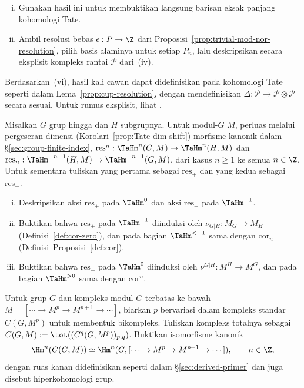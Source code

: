 \begin{Exercises}
\begin{enumerate}[(i)]
		\item Gunakan hasil ini untuk membuktikan langsung barisan eksak panjang
		kohomologi Tate.
		\item Ambil resolusi bebas $\epsilon:P\to\Z$ dari
		Proposisi~\ref{prop:trivial-mod-nor-resolution}, pilih basis alaminya
		untuk setiap $P_n$, lalu deskripsikan secara eksplisit kompleks rantai
		$\mathcal{P}$ dari~(iv).
	\end{enumerate}

	Berdasarkan~(vi), hasil kali cawan dapat didefinisikan pada kohomologi
	Tate seperti dalam Lema~\ref{prop:cup-resolution}, dengan mendefinisikan
	$\Delta:\mathcal{P}\to\mathcal{P}\otimes\mathcal{P}$ secara sesuai.
	Untuk rumus eksplisit, lihat \cite[Bab IV, \S 7]{CF67}.

	\item Misalkan $G$ grup hingga dan $H$ subgrupnya. Untuk modul-$G$ $M$,
	perluas melalui pergeseran dimensi (Korolari~\ref{prop:Tate-dim-shift})
	morfisme kanonik dalam \S\ref{sec:group-finite-index},
	$\mathrm{res}^n:\TaHm^n(G,M)\to\TaHm^n(H,M)$ dan
	$\mathrm{res}_n:\TaHm^{-n-1}(H,M)\to\TaHm^{-n-1}(G,M)$, dari kasus
	$n\geq1$ ke semua $n\in\Z$. Untuk sementara tuliskan yang pertama sebagai
	$\mathrm{res}_+$ dan yang kedua sebagai $\mathrm{res}_-$.
	\begin{enumerate}[(i)]
		\item Deskripsikan aksi $\mathrm{res}_+$ pada $\TaHm^0$ dan aksi
		$\mathrm{res}_-$ pada $\TaHm^{-1}$.
		\item Buktikan bahwa $\mathrm{res}_+$ pada $\TaHm^{-1}$ diinduksi oleh
		$\nu_{G|H}:M_G\to M_H$ (Definisi~\ref{def:cor-zero}), dan pada bagian
		$\TaHm^{<-1}$ sama dengan $\mathrm{cor}_n$
		(Definisi--Proposisi~\ref{def:cor}).
		\item Buktikan bahwa $\mathrm{res}_-$ pada $\TaHm^0$ diinduksi oleh
		$\nu^{G|H}:M^H\to M^G$, dan pada bagian $\TaHm^{>0}$ sama dengan
		$\mathrm{cor}^n$.
	\end{enumerate}

	\item Untuk grup $G$ dan kompleks modul-$G$ terbatas ke bawah
	$M=[\cdots\to M^p\to M^{p+1}\to\cdots]$, biarkan $p$ bervariasi dalam
	kompleks standar $C(G,M^p)$ untuk membentuk bikompleks. Tuliskan kompleks
	totalnya sebagai
	$C(G,M):=\tot((C^q(G,M^p))_{p,q})$. Buktikan isomorfisme kanonik
	\[ \Hm^n(C(G,M))\simeq
	\Hm^n(G,[\cdots\to M^p\to M^{p+1}\to\cdots]),\qquad n\in\Z, \]
	dengan ruas kanan didefinisikan seperti dalam \S\ref{sec:derived-primer}
	dan juga disebut hiperkohomologi grup.


\end{Exercises}
